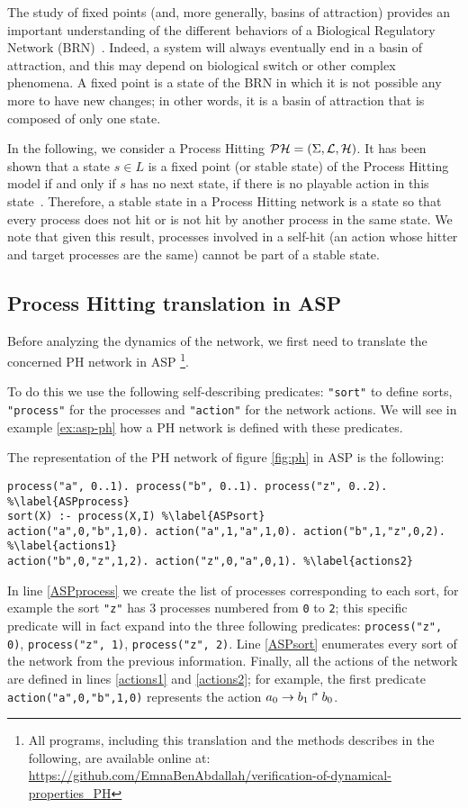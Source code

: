 The study of fixed points (and, more generally, basins of attraction) provides an important understanding of the different behaviors of a Biological Regulatory Network (BRN)~\cite{wuensche1998genomic}.
Indeed, a system will always eventually end in a basin of attraction,
and this may depend on biological switch or other complex phenomena.
A fixed point is a state of the BRN in which it is not possible any more to have new changes;
in other words, it is a basin of attraction that is composed of only one state.

In the following, we consider a Process Hitting $\mathcal{PH} = (\Sigma, \mathcal{L}, \mathcal{H})$.
It has been shown that a state $s \in L$ is a fixed point (or stable state) of the Process Hitting model if and only if $s$ has no next state, \ie if there is no playable action in this state~\cite{PMR10-TCSB}.
Therefore, a stable state in a Process Hitting network is a state so that
every process does not hit or is not hit by another process in the same state.
We note that given this result, processes involved in a self-hit (an action whose hitter and target processes are the same) cannot be part of a stable state.

\subsection{Process Hitting translation in ASP}
Before analyzing the dynamics of the network,
we first need to translate the concerned PH network in ASP \footnote{All programs, including this translation and the methods describes in the following, are available online at: \url{https://github.com/EmnaBenAbdallah/verification-of-dynamical-properties_PH}}.

To do this we use the following self-describing predicates:
\texttt{"sort"} to define sorts, \texttt{"process"} for the processes and \texttt{"action"} for the network actions. We will see in example \ref{ex:asp-ph} how a PH network is defined with these predicates.

\begin{example}
\label{ex:asp-ph}
The representation of the PH network of figure \ref{fig:ph} in ASP is the following:
\begin{lstlisting}
process("a", 0..1). process("b", 0..1). process("z", 0..2). %\label{ASPprocess}
sort(X) :- process(X,I) %\label{ASPsort}
action("a",0,"b",1,0). action("a",1,"a",1,0). action("b",1,"z",0,2). %\label{actions1}
action("b",0,"z",1,2). action("z",0,"a",0,1). %\label{actions2}
\end{lstlisting}
In line \ref{ASPprocess} we create the list of processes corresponding to each sort,
for example the sort \texttt{"z"} has 3 processes numbered from \texttt{0} to \texttt{2};
this specific predicate will in fact expand into the three following predicates:
\texttt{process("z", 0)}, \texttt{process("z", 1)}, \texttt{process("z", 2)}.
Line \ref{ASPsort} enumerates every sort of the network from the previous information.
Finally, all the actions of the network are defined in lines \ref{actions1} and \ref{actions2};
for example, the first predicate \texttt{action("a",0,"b",1,0)} represents the action
$a_0\rightarrow b_1\Rsh b_0$.
\end{example}

